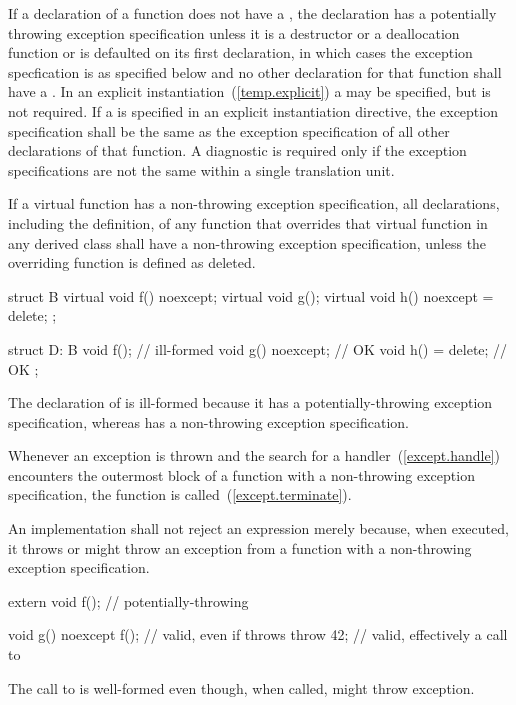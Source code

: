 \pnum
If a declaration of a function
does not have a ,
the declaration has a potentially throwing exception specification
unless it is a destructor or a deallocation function
or is defaulted on its first declaration,
in which cases the exception specfication
is as specified below
and no other declaration for that function
shall have a .
In an explicit instantiation~(\ref{temp.explicit})
a  may be specified,
but is not required.
If a  is specified
in an explicit instantiation directive,
the exception specification shall be the same as
the exception specification of all other declarations of that function.
A diagnostic is required only if the
exception specifications are not the same
within a single translation unit.

\pnum
{}%
If a virtual function has a
non-throwing exception specification,
all declarations, including the definition, of any function
that overrides that virtual function in any derived class
shall have a non-throwing
exception specification,
unless the overriding function is defined as deleted.
\begin{example}
\begin{codeblock}
struct B {
  virtual void f() noexcept;
  virtual void g();
  virtual void h() noexcept = delete;
};

struct D: B {
  void f();                     // ill-formed
  void g() noexcept;            // OK
  void h() = delete;            // OK
};
\end{codeblock}

The declaration of
is ill-formed because it
has a potentially-throwing exception specification,
whereas
has a non-throwing exception specification.
\end{example}

\pnum
{}%
%
Whenever an exception is thrown
and the search for a handler~(\ref{except.handle})
encounters the outermost block of a function with a
non-throwing exception specification,
the function  is called~(\ref{except.terminate}).
\begin{note}
An implementation shall not reject an expression merely because, when
executed, it throws or might
throw an exception from a function with a non-throwing exception specification.
\end{note}
\begin{example}
\begin{codeblock}
extern void f();       // potentially-throwing

void g() noexcept {
  f();                 // valid, even if  throws
  throw 42;            // valid, effectively a call to 
}
\end{codeblock}
The call to
is well-formed even though, when called,
might throw exception.
\end{example}

